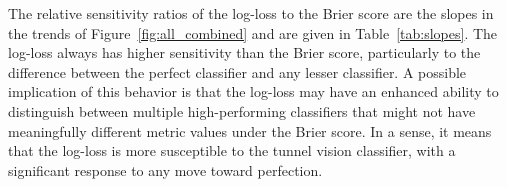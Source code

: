 The relative sensitivity ratios of the log-loss to the Brier score are the slopes in the trends of Figure~\ref{fig:all_combined} and are given in Table~\ref{tab:slopes}.
The log-loss always has higher sensitivity than the Brier score, particularly to the difference between the perfect classifier and any lesser classifier.
A possible implication of this behavior is that the log-loss may have an enhanced ability to distinguish between multiple high-performing classifiers that might not have meaningfully different metric values under the Brier score.
In a sense, it means that the log-loss is more susceptible to the tunnel vision classifier, with a significant response to any move toward perfection.




